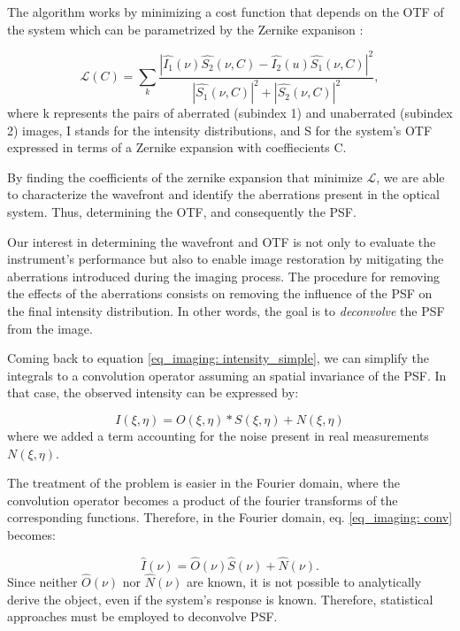 The algorithm works by minimizing a cost function that depends on the OTF of the system which can be parametrized by the Zernike expanison \citep{pd_cost}: 

\begin{equation}
  \mathcal{L} (C) = \sum _ {k} \frac{|\hat{I_1} (\nu ) \hat{S_2} (\nu , C) - \hat{I_2}(u) \hat{S_1}(\nu , C)| ^2}{|\hat{S_1}(\nu , C)| ^2 + |\hat{S_2}(\nu , C)| ^2} , 
\end{equation}
where k represents the pairs of aberrated (subindex 1) and unaberrated (subindex 2) images, I stands for the intensity distributions, and S for the system's OTF expressed in terms of a Zernike expansion with coeffiecients C. 

By finding the coefficients of the zernike expansion that minimize $\mathcal{L}$, we are able to characterize the wavefront and identify the aberrations present in the optical system. Thus, determining the OTF, and consequently the PSF.

Our interest in determining the wavefront and OTF is not only to evaluate the instrument's performance but also to enable image restoration by mitigating the aberrations introduced during the imaging process. The procedure for removing the effects of the aberrations consists on removing the influence of the PSF on the final intensity distribution. In other words, the goal is to \textit{deconvolve} the PSF from the image.

Coming back to equation \eqref{eq_imaging: intensity_simple}, we can simplify the integrals to a convolution operator assuming an spatial invariance of the PSF. In that case, the observed intensity can be expressed by:

\begin{equation}
  I(\xi, \eta) = O(\xi, \eta) * S(\xi, \eta) + N (\xi, \eta)
  \label{eq_imaging: conv} 
\end{equation}  
where we added a term accounting for the noise present in real measurements $N (\xi, \eta)$.

The treatment of the problem is easier in the Fourier domain, where the convolution operator becomes a product of the fourier transforms of the corresponding functions. Therefore, in the Fourier domain, eq. \ref{eq_imaging: conv} becomes: 

\begin{equation}
  \hat{I}(\nu ) = \hat{O}(\nu)\hat{S}(\nu)+\hat{N}(\nu).
\end{equation}
Since neither $\hat{O}(\nu)$ nor $\hat{N}(\nu)$ are known, it is not possible to analytically derive the object, even if the system's response is known. Therefore, statistical approaches must be employed to deconvolve PSF.

